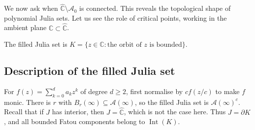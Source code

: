 \documentclass[11pt,a4paper]{article}
\begin{document}
We now ask when $\widehat{\mathbb C}\setminus\mathcal A_0$ is connected. This reveals the topological shape of polynomial Julia sets. Let us see the role of critical points, working in the ambient plane $\mathbb C\subset\widehat{\mathbb C}$.
\setcounter{definition}{13}\begin{definition}
The filled Julia set is $K=\{z\in\mathbb C:\text{the orbit of }z\text{ is bounded}\}$.
\end{definition}
\subsection{Description of the filled Julia set}
For $f(z)=\sum_{k=0}^{d}a_kz^k$ of degree $d\ge2$, first normalise by $cf(z/c)$ to make $f$ monic. There is $r$ with $B_r(\infty)\subseteq\mathcal A(\infty)$, so the filled Julia set is $\mathcal A(\infty)^c$. Recall that if $J$ has interior, then $J=\widehat{\mathbb C}$, which is not the case here. Thus $J=\partial K$, and all bounded Fatou components belong to $\operatorname{Int}(K)$.
\end{document}
